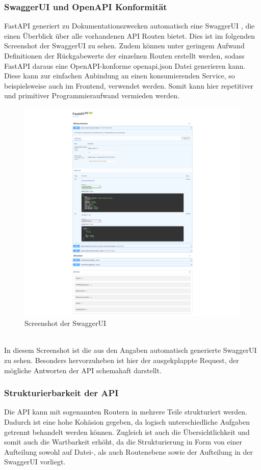 \subsubsection{SwaggerUI und OpenAPI Konformität}
FastAPI generiert zu Dokumentationszwecken automatisch eine SwaggerUI \cite{swaggerui}, 
die einen Überblick über alle vorhandenen API Routen bietet. Dies ist im folgenden Screenshot der 
SwaggerUI zu sehen. Zudem können unter geringem Aufwand Definitionen der Rückgabewerte der 
einzelnen Routen erstellt werden, sodass FastAPI daraus eine OpenAPI-konforme \cite{openapi} 
openapi.json Datei generieren kann. Diese kann zur einfachen Anbindung an einen konsumierenden 
Service, so beispielsweise auch im Frontend, verwendet werden. Somit kann hier repetitiver und 
primitiver Programmieraufwand vermieden werden. ~\\
\begin{figure}[!htb]
 \centering
 \includegraphics[width=\linewidth]{figures/SwaggerUI.png}
 \caption{Screenshot der SwaggerUI}
 \label{fig:SwaggerUI}
\end{figure}~\\
In diesem Screenshot ist die aus den Angaben automatisch generierte SwaggerUI zu sehen. 
Besonders hervorzuheben ist hier der ausgekplappte Request, der mögliche Antworten der 
API schemahaft darstellt.


\subsubsection{Strukturierbarkeit der API}
Die API kann mit sogenannten Routern in mehrere Teile strukturiert werden. 
Dadurch ist eine hohe Kohäsion gegeben, da logisch unterschiedliche Aufgaben getrennt behandelt 
werden können. Zugleich ist auch die Übersichtlichkeit und somit auch die Wartbarkeit erhöht, 
da die Strukturierung in Form von einer Aufteilung sowohl auf Datei-, als auch Routenebene 
sowie der Aufteilung in der SwaggerUI vorliegt.

